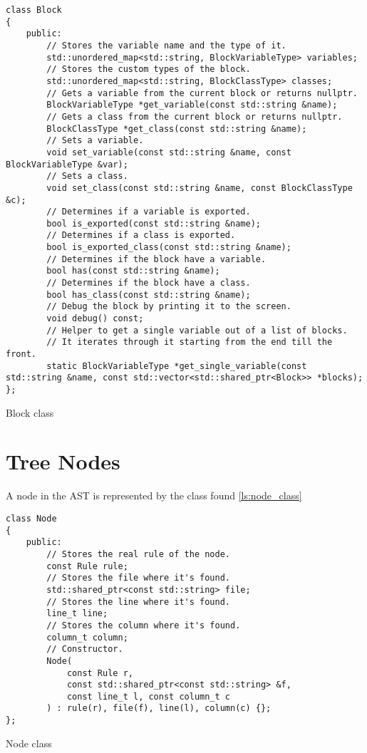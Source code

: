 \begin{listing}[H]
\begin{verbatim}
class Block
{
    public:
        // Stores the variable name and the type of it.
        std::unordered_map<std::string, BlockVariableType> variables;
        // Stores the custom types of the block.
        std::unordered_map<std::string, BlockClassType> classes;
        // Gets a variable from the current block or returns nullptr.
        BlockVariableType *get_variable(const std::string &name);
        // Gets a class from the current block or returns nullptr.
        BlockClassType *get_class(const std::string &name);
        // Sets a variable.
        void set_variable(const std::string &name, const BlockVariableType &var);
        // Sets a class.
        void set_class(const std::string &name, const BlockClassType &c);
        // Determines if a variable is exported.
        bool is_exported(const std::string &name);
        // Determines if a class is exported.
        bool is_exported_class(const std::string &name);
        // Determines if the block have a variable.
        bool has(const std::string &name);
        // Determines if the block have a class.
        bool has_class(const std::string &name);
        // Debug the block by printing it to the screen.
        void debug() const;
        // Helper to get a single variable out of a list of blocks.
        // It iterates through it starting from the end till the front.
        static BlockVariableType *get_single_variable(const std::string &name, const std::vector<std::shared_ptr<Block>> *blocks);
};
\end{verbatim}
\caption{Block class}
\label{ls:block_class}
\end{listing}

\section{Tree Nodes}
\label{sec:tree_nodes}

A node in the AST is represented by the class found \autoref{ls:node_class}

\begin{listing}[H]
\begin{verbatim}
class Node
{
    public:
        // Stores the real rule of the node.
        const Rule rule;
        // Stores the file where it's found.
        std::shared_ptr<const std::string> file;
        // Stores the line where it's found.
        line_t line;
        // Stores the column where it's found.
        column_t column;
        // Constructor.
        Node(
            const Rule r,
            const std::shared_ptr<const std::string> &f,
            const line_t l, const column_t c
        ) : rule(r), file(f), line(l), column(c) {};
};
\end{verbatim}
\caption{Node class}
\label{ls:node_class}
\end{listing}

